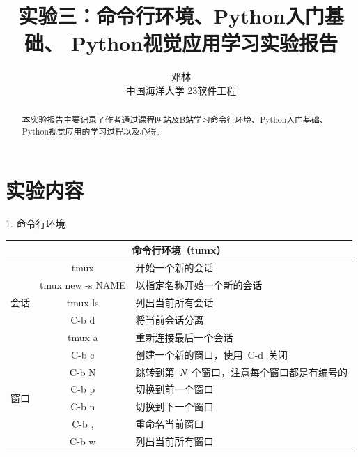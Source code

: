 \documentclass{ctexart}
\title{\heiti \zihao{2}实验三：命令行环境、Python入门基础、
Python视觉应用学习实验报告}
\author{\kaishu \zihao{-4} 邓林\qquad 23020007014\\
\songti \zihao{-5}中国海洋大学 \qquad 23软件工程 }
\date{}
\begin{document}
    \maketitle
\vspace{-20pt}\begin{abstract}				
    本实验报告主要记录了作者通过课程网站及B站学习命令行环境、Python入门基础、
    Python视觉应用的学习过程以及心得。
\end{abstract}

\section{实验内容}
1. 命令行环境\\
\begin{longtable}{c|cl}
    \hline
    \multicolumn{3}{c}{命令行环境（tumx）}                                                                     \\* 
    \hline
    \multirow{5}{*}{会话} & tmux                                      & 开始一个新的会话                          \\*
                        & tmux new -s NAME                          & 以指定名称开始一个新的会话                     \\*
                        & tmux ls                                   & 列出当前所有会话                          \\*
                        & C-b d                                     & 将当前会话分离                           \\*
                        & tmux a                                    & 重新连接最后一个会话                        \\* 
    \hline
    \multirow{6}{*}{窗口} & C-b c                                     & 创建一个新的窗口，使用~C-d~关闭                \\*
                        & C-b N                                     & 跳转到第~\textit{N}~个窗口，注意每个窗口都是有编号的  \\*
                        & C-b p                                     & 切换到前一个窗口                          \\*
                        & C-b n                                     & 切换到下一个窗口                          \\*
                        & C-b ,                                     & 重命名当前窗口                           \\*
                        & C-b w                                     & 列出当前所有窗口                          \\* 

\end{longtable}
\end{document}
